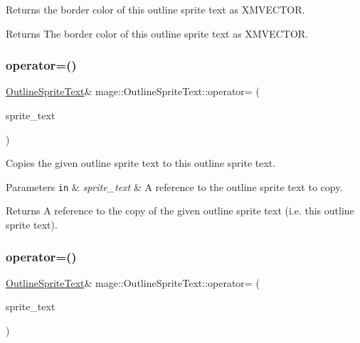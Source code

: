 Returns the border color of this outline sprite text as {\ttfamily X\+M\+V\+E\+C\+T\+OR}.

\begin{DoxyReturn}{Returns}
The border color of this outline sprite text as {\ttfamily X\+M\+V\+E\+C\+T\+OR}. 
\end{DoxyReturn}
\hypertarget{classmage_1_1_outline_sprite_text_a324ec8e5c0d319b449895cc45d6b3807}{}\label{classmage_1_1_outline_sprite_text_a324ec8e5c0d319b449895cc45d6b3807} 
\subsubsection{\texorpdfstring{operator=()}{operator=()}\hspace{0.1cm}{\footnotesize\ttfamily [1/2]}}
{\footnotesize\ttfamily \hyperlink{classmage_1_1_outline_sprite_text}{Outline\+Sprite\+Text}\& mage\+::\+Outline\+Sprite\+Text\+::operator= (\begin{DoxyParamCaption}\item[{const \hyperlink{classmage_1_1_outline_sprite_text}{Outline\+Sprite\+Text} \&}]{sprite\+\_\+text }\end{DoxyParamCaption})\hspace{0.3cm}{\ttfamily [delete]}}

Copies the given outline sprite text to this outline sprite text.


\begin{DoxyParams}[1]{Parameters}
\mbox{\tt in}  & {\em sprite\+\_\+text} & A reference to the outline sprite text to copy. \\
\hline
\end{DoxyParams}
\begin{DoxyReturn}{Returns}
A reference to the copy of the given outline sprite text (i.\+e. this outline sprite text). 
\end{DoxyReturn}
\hypertarget{classmage_1_1_outline_sprite_text_a3549e97af5461728a399f01af9125486}{}\label{classmage_1_1_outline_sprite_text_a3549e97af5461728a399f01af9125486} 
\subsubsection{\texorpdfstring{operator=()}{operator=()}\hspace{0.1cm}{\footnotesize\ttfamily [2/2]}}
{\footnotesize\ttfamily \hyperlink{classmage_1_1_outline_sprite_text}{Outline\+Sprite\+Text}\& mage\+::\+Outline\+Sprite\+Text\+::operator= (\begin{DoxyParamCaption}\item[{\hyperlink{classmage_1_1_outline_sprite_text}{Outline\+Sprite\+Text} \&\&}]{sprite\+\_\+text }\end{DoxyParamCaption})\hspace{0.3cm}{\ttfamily [delete]}}

